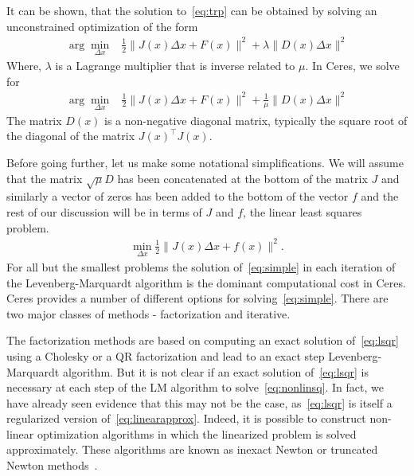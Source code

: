 It can be shown, that the solution to~\eqref{eq:trp} can be obtained by solving an unconstrained optimization of the form
\begin{align}
        \arg\min_{\Delta x}& \frac{1}{2}\|J(x)\Delta x + F(x)\|^2 +\lambda  \|D(x)\Delta x\|^2
\end{align}
Where, $\lambda$ is a Lagrange multiplier that is inverse related to $\mu$. In Ceres, we solve for
\begin{align}
        \arg\min_{\Delta x}& \frac{1}{2}\|J(x)\Delta x + F(x)\|^2 + \frac{1}{\mu} \|D(x)\Delta x\|^2
\label{eq:lsqr}
\end{align}
The matrix $D(x)$ is a non-negative diagonal matrix, typically the square root of the diagonal of the matrix $J(x)^\top J(x)$.

Before going further, let us make some notational simplifications. We will assume that the matrix $\sqrt{\mu} D$ has been concatenated at the bottom of the matrix $J$ and similarly a vector of zeros has been added to the bottom of the vector $f$ and the rest of our discussion will be in terms of $J$ and $f$, \ie the linear least squares problem.
\begin{align}
 \min_{\Delta x} \frac{1}{2} \|J(x)\Delta x + f(x)\|^2 .
 \label{eq:simple}
\end{align}
For all but the smallest problems the solution of~\eqref{eq:simple} in each iteration of the Levenberg-Marquardt algorithm is the dominant computational cost in Ceres. Ceres provides a number of different options for solving~\eqref{eq:simple}. There are two major classes of methods - factorization and iterative.

The factorization methods are based on computing an exact solution of~\eqref{eq:lsqr} using a Cholesky or a QR factorization and lead to an exact step Levenberg-Marquardt algorithm. But it is not clear if an exact solution of~\eqref{eq:lsqr} is necessary at each step of the LM algorithm to solve~\eqref{eq:nonlinsq}. In fact, we have already seen evidence that this may not be the case, as~\eqref{eq:lsqr} is itself a regularized version of~\eqref{eq:linearapprox}. Indeed, it is possible to construct non-linear optimization algorithms in which the linearized problem is solved approximately. These algorithms are known as inexact Newton or truncated Newton methods~\cite{nocedal2000numerical}.

